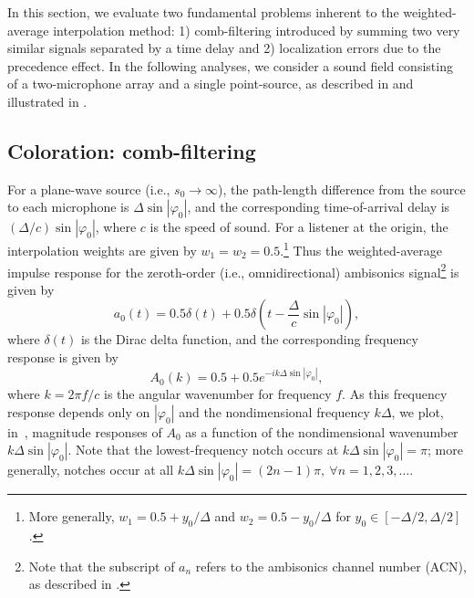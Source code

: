 In this section, we evaluate two fundamental problems inherent to the weighted-average interpolation method: 1) comb-filtering introduced by summing two very similar signals separated by a time delay and 2) localization errors due to the precedence effect.
In the following analyses, we consider a sound field consisting of a two-microphone array and a single point-source, as described in  and illustrated in .

\subsection{Coloration: comb-filtering}
For a plane-wave source (i.e., $s_0 \to \infty$),
the path-length difference from the source to each microphone is $\Delta \sin |\varphi_0|$,
and the corresponding time-of-arrival delay is $(\Delta / c) \sin |\varphi_0|$, where $c$ is the speed of sound.
For a listener at the origin, the interpolation weights are given by $w_1 = w_2 = 0.5$.\footnote{More generally, $w_1 = 0.5 + y_0/\Delta$ and $w_2 = 0.5 - y_0/\Delta$ for $y_0 \in [-\Delta/2,\Delta/2]$.}
Thus the weighted-average impulse response for the zeroth-order (i.e., omnidirectional) ambisonics signal\footnote{Note that the subscript of $a_n$ refers to the ambisonics channel number (ACN), as described in .} is given by
\begin{equation}
a_0(t) = 0.5 \delta(t) + 0.5 \delta \left(t - \frac{\Delta}{c} \sin \left|\varphi_0\right| \right),
\end{equation}
where $\delta(t)$ is the Dirac delta function, and the corresponding frequency response is given by
\begin{equation}
A_0(k) = 0.5 + 0.5 e^{-i k \Delta \sin \left|\varphi_0\right|},
\end{equation}
where $k = 2 \pi f / c$ is the angular wavenumber for frequency $f$.
As this frequency response depends only on $|\varphi_0|$ and the nondimensional frequency $k\Delta$,
we plot, in~, magnitude responses of $A_0$ as a function of the nondimensional wavenumber $k\Delta \sin|\varphi_0|$.
Note that the lowest-frequency notch occurs at $k\Delta \sin|\varphi_0| = \pi$; more generally, notches occur at all $k\Delta \sin|\varphi_0| = (2n-1)\pi,~\forall n = 1,2,3,\dots$.

